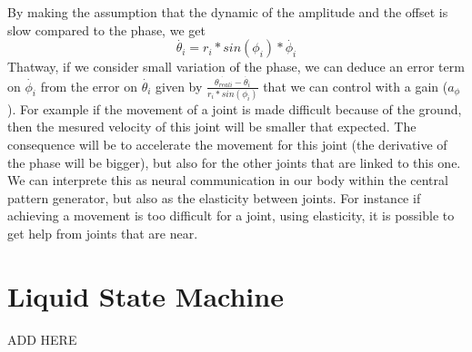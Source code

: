 By making the assumption that the dynamic of the amplitude and the offset is slow compared to the phase, we get
\begin{equation*}
    \dot{\theta_i} = r_i * sin(\phi_i) * \dot{\phi_i} \tag{2''}
\end{equation*}
Thatway, if we consider small variation of the phase, we can deduce an error term on $\dot{\phi_i}$ from the error on $\dot{\theta_i}$ given by $\frac {\dot{\theta_{reali}} - \dot{\theta_i}} {r_i * sin (\phi_i)}$ that we can control with a gain ($a_{\phi}$).
For example if the movement of a joint is made difficult because of the ground, then the mesured velocity of this joint will be smaller that expected. The consequence will be to accelerate the movement for this joint (the derivative of the phase will be bigger), but also for the other joints that are linked to this one. We can interprete this as neural communication in our body within the central pattern generator, but also as the elasticity between joints. For instance if achieving a movement is too difficult for a joint, using elasticity, it is possible to get help from joints that are near. 


\section{Liquid State Machine}

ADD HERE
